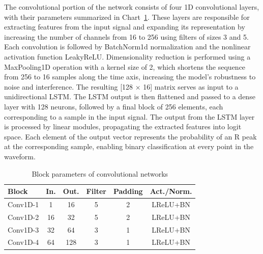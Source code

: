 \documentclass[journal]{IEEEtran}
\begin{document}
The convolutional portion of the network consists of four 1D convolutional layers, with their parameters summarized in Chart~\ref{tab:ecg_layers}. These layers are responsible for extracting features from the input signal and expanding its representation by increasing the number of channels from 16 to 256 using filters of sizes 3 and 5. Each convolution is followed by BatchNorm1d normalization and the nonlinear activation function LeakyReLU. Dimensionality reduction is performed using a MaxPooling1D operation with a kernel size of 2, which shortens the sequence from 256 to 16 samples along the time axis, increasing the model’s robustness to noise and interference. The resulting [128 × 16] matrix serves as input to a unidirectional LSTM. The LSTM output is then flattened and passed to a dense layer with 128 neurons, followed by a final block of 256 elements, each corresponding to a sample in the input signal. The output from the LSTM layer is processed by linear modules, propagating the extracted features into logit space. Each element of the output vector represents the probability of an R peak at the corresponding sample, enabling binary classification at every point in the waveform.

\begin{table}[h!]
\centering
\caption{Block parameters of convolutional networks}
\label{tab:ecg_layers}
\begin{tabular}{|l|c|c|c|c|c|}
\hline
\textbf{Block} & \textbf{In.} & \textbf{Out.} & \textbf{Filter} & \textbf{Padding} & \textbf{Act./Norm.} \\
\hline
Conv1D-1 & 1   & 16  & 5 & 2 & LReLU+BN \\
Conv1D-2 & 16  & 32  & 5 & 2 & LReLU+BN \\
Conv1D-3 & 32  & 64  & 3 & 1 & LReLU+BN \\
Conv1D-4 & 64  & 128 & 3 & 1 & LReLU+BN \\
\hline
\end{tabular}
\end{table}
\end{document}
